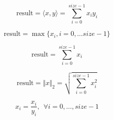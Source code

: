 \documentclass{article}
\begin{document}
\[\mathrm{result} = \langle x,y \rangle = \sum\limits_{i = 0}^{size-1} x_i y_i\]
\pagebreak

\[\mathrm{result} = \max \lbrace x_i, i = 0, \dots size-1 \rbrace\]
\pagebreak

\[\mathrm{result} = \sum\limits_{i = 0}^{size-1} x_i \]
\pagebreak

\[\mathrm{result} = \Vert x \Vert_2 = \sqrt{\sum\limits_{i = 0}^{size-1} x_i^2} \]
\pagebreak

\[ x_i = \frac{x_i}{y_i}, ~~\forall i = 0, \dots, size-1 \]
\pagebreak
\end{document}
